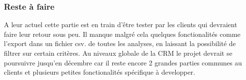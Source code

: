 \subsubsection{Reste à faire}
A leur actuel cette partie est en train d'être tester par les clients qui devraient faire leur retour sous peu. Il manque malgré cela quelques fonctionalités comme l'export dans un fichier csv. de toutes les analyses, en laissant la possibilité de filtrer sur certain critères. Au niveaux globale de la CRM le projet devrait se poursuivre jusqu'en décembre car il reste encore 2 grandes parties communes au clients et plusieurs petites fonctionalités spécifique à developper.  
